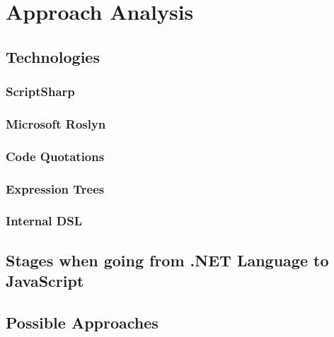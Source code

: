 \chapter{Approach Analysis}

\section{Technologies}
	\subsection{ScriptSharp}
	\subsection{Microsoft Roslyn} %
	\label{ssub:microsoft_roslyn}
	

	\subsection{Code Quotations} %
	\label{ssub:code_quotations}
	

	\subsection{Expression Trees} %
	\label{ssub:expression_trees}
	

	\subsection{Internal DSL} %
	\label{ssub:internal_dsl}
	

\section{Stages when going from .NET Language to JavaScript} %
\label{sec:stages_when_going_from_net_language_to_javascript}


\section{Possible Approaches} %
\label{sec:possible_approaches}

